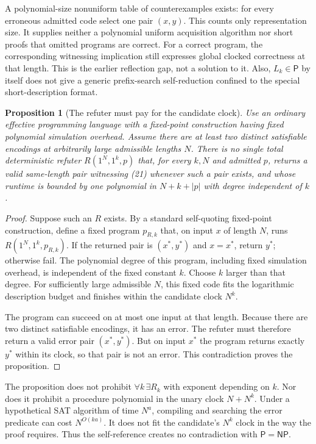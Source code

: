 \documentclass[11pt]{article}
\newtheorem{proposition}{Proposition}
\begin{document}
A polynomial-size nonuniform table of counterexamples exists:
for every erroneous admitted code select one pair $(x,y)$.
This counts only representation size. It supplies neither a polynomial
uniform acquisition algorithm nor short proofs that omitted programs
are correct. For a correct program, the corresponding witnessing
implication still expresses global clocked correctness at that length.
This is the earlier reflection gap, not a solution to it.
Also, $L_k\in\mathsf P$ by itself does not give a generic prefix-search
self-reduction confined to the special short-description format.

\begin{proposition}[The refuter must pay for the candidate clock]\label{prop:refuter}
Use an ordinary effective programming language with a fixed-point
construction having fixed polynomial simulation overhead.
Assume there are at least two distinct satisfiable encodings at
arbitrarily large admissible lengths $N$.
There is no single total deterministic refuter
$R(1^N,1^k,p)$ that, for every $k,N$ and admitted $p$, returns a valid
same-length pair witnessing (21) whenever such a pair exists, and
whose runtime is bounded by one polynomial in $N+k+|p|$ with degree
independent of $k$.
\end{proposition}

\begin{proof}
Suppose such an $R$ exists. By a standard self-quoting fixed-point
construction, define a fixed program $p_{R,k}$ that, on input $x$
of length $N$, runs $R(1^N,1^k,p_{R,k})$. If the returned pair is
$(x^*,y^*)$ and $x=x^*$, return $y^*$; otherwise fail.
The polynomial degree of this program, including fixed simulation
overhead, is independent of the fixed constant $k$.
Choose $k$ larger than that degree. For sufficiently large admissible
$N$, this fixed code fits the logarithmic description budget and
finishes within the candidate clock $N^k$.

The program can succeed on at most one input at that length.
Because there are two distinct satisfiable encodings, it has an error.
The refuter must therefore return a valid error pair $(x^*,y^*)$.
But on input $x^*$ the program returns exactly $y^*$ within its clock,
so that pair is not an error. This contradiction proves the proposition.
\end{proof}

The proposition does not prohibit
$\forall k\,\exists R_k$ with exponent depending on $k$.
Nor does it prohibit a procedure polynomial in the unary clock
$N+N^k$. Under a hypothetical SAT algorithm of time $N^a$,
compiling and searching the error predicate can cost $N^{O(ka)}$.
It does not fit the candidate's $N^k$ clock in the way the proof
requires. Thus the self-reference creates no contradiction with
$\mathsf P=\mathsf{NP}$.
\end{document}
